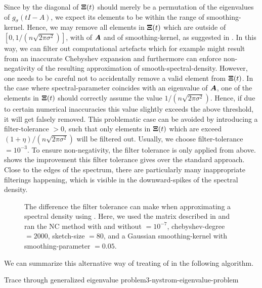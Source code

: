 Since by  the diagonal of $\boldsymbol{\Xi}(t)$
should merely be a permutation of the eigenvalues of $g_{\sigma}(tI - A)$,
we expect its elements to be within the range of \gls{smoothing-kernel}. Hence, we may remove
all elements in $\boldsymbol{\Xi}(t)$ which are outside of $[0, 1 / (n \sqrt{2 \pi \sigma^2})]$,
with  of $\boldsymbol{A}$ and  of \gls{smoothing-kernel},
as suggested in \cite{lin2017randomized}.
In this way, we can filter out computational artefacts which for example might result
from an inaccurate Chebyshev expansion and furthermore 
can enforce non-negativity of the resulting approximation of
\gls{smooth-spectral-density}. However, one needs to be careful not to accidentally
remove a valid element from $\boldsymbol{\Xi}(t)$. In the case where \gls{spectral-parameter}
coincides with an eigenvalue of $\boldsymbol{A}$, one of the elements in $\boldsymbol{\Xi}(t)$
should correctly assume the value $1 / (n \sqrt{2 \pi \sigma^2})$. Hence, if due to
certain numerical inaccuracies this value slightly exceeds the above threshold,
it will get falsely removed. This problematic case can be avoided by introducing a
\gls{filter-tolerance} $>0$, such that only elements in $\boldsymbol{\Xi}(t)$ which are
exceed $ (1 + \eta) / (n \sqrt{2 \pi \sigma^2})$ will be filtered out. Usually,
we choose \gls{filter-tolerance} $=10^{-3}$. To ensure
non-negativity, the filter tolerance is only applied from above. 
shows the improvement this filter tolerance gives over the standard approach.
Close to the edges of the spectrum, there are particularly many inappropriate
filterings happening, which is visible in the downward-spikes of the spectral density.

\begin{figure}[ht]
    \centering
    
    \caption{The difference the filter tolerance can make when approximating
        a spectral density using . 
        Here, we used the matrix described in 
        and ran the \gls{NC} method with and without  $= 10^{-7}$,
        \gls{chebyshev-degree} $=2000$, \gls{sketch-size} $=80$, and a
        Gaussian \gls{smoothing-kernel} with \gls{smoothing-parameter} $=0.05$.}
    \label{fig:3-nystrom-filter-tolerance}
\end{figure}

We can summarize this alternative way of treating
 of 
in the following algorithm.
\begin{algo}{Trace through generalized eigenvalue problem}{3-nystrom-eigenvalue-problem}
    
\end{algo}

